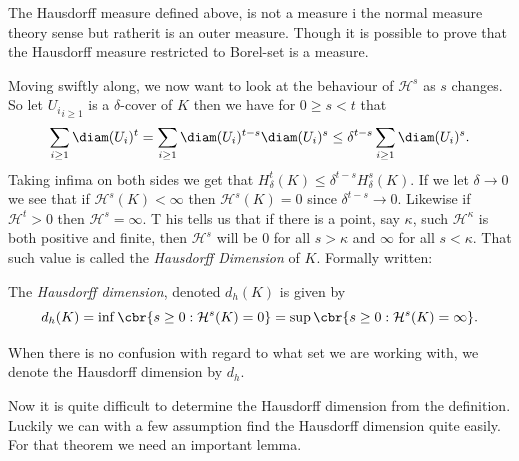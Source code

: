 The Hausdorff measure defined above, is not a measure i the normal measure theory sense but ratherit is an outer measure. Though it is possible to prove that the Hausdorff measure restricted to Borel-set is a measure.


Moving swiftly along, we now want to look at the behaviour of $\mathcal{H}^{s}$ as $s$ changes. So let ${U_i}_{i \geq 1}$ is a $\delta$-cover of $K$ then we have for $0 \geq s < t$ that
\begin{equation}
	\sum_{i \geq 1} \diam(U_i)^{t} = \sum_{i \geq 1} \diam(U_i)^{t-s}\diam(U_i)^{s} \leq \delta^{t-s}\sum_{i \geq 1}\diam(U_i)^{s}.
\end{equation}
Taking infima on both sides we get that $H^t_{\delta}(K) \leq \delta^{t-s}H^s_{\delta}(K)$. If we let $\delta \to 0$ we see that if $\mathcal{H}^{s}(K) < \infty$ then $\mathcal{H}^{s}(K) = 0$ since $\delta^{t-s} \to 0$. Likewise if $\mathcal{H}^{t} > 0$ then $\mathcal{H}^{s} = \infty$. 
T
his tells us that if there is a point, say $\kappa$, such $\mathcal{H}^{\kappa}$ is both positive and finite, then $\mathcal{H}^{s}$ will be 0 for all $s > \kappa$ and $\infty$ for all $s < \kappa$. That such value is called the \emph{Hausdorff Dimension} of $K$. Formally written:
\begin{defi}\label{hausdorffDimDefi}
	The \emph{Hausdorff dimension}, denoted $d_h(K)$ is given by
	\begin{equation}
		d_h(K) = \inf\cbr{s \geq 0 : \mathcal{H}^{s}(K) = 0} = \sup\cbr{s \geq 0 : \mathcal{H}^{s}(K) = \infty}.
	\end{equation}
\end{defi} 
When there is no confusion with regard to what set we are working with, we denote the Hausdorff dimension by $d_h$.

Now it is quite difficult to determine the Hausdorff dimension from the definition. Luckily we can with a few assumption find the Hausdorff dimension quite easily. For that theorem we need an important lemma.


